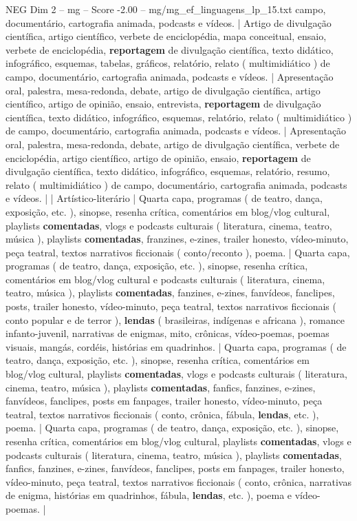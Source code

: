 \begin{textsample}{NEG Dim 2 – mg – Score -2.00 – mg/mg\_ef\_linguagens\_lp\_15.txt}
campo, documentário, cartografia animada, podcasts e vídeos. | Artigo de divulgação científica, artigo científico, verbete de enciclopédia, mapa conceitual, ensaio, verbete de enciclopédia, \textbf{reportagem} de divulgação científica, texto didático, infográfico, esquemas, tabelas, gráficos, relatório, relato ( multimidiático ) de campo, documentário, cartografia animada, podcasts e vídeos. | Apresentação oral, palestra, mesa-redonda, debate, artigo de divulgação científica, artigo científico, artigo de opinião, ensaio, entrevista, \textbf{reportagem} de divulgação científica, texto didático, infográfico, esquemas, relatório, relato ( multimidiático ) de campo, documentário, cartografia animada, podcasts e vídeos. | Apresentação oral, palestra, mesa-redonda, debate, artigo de divulgação científica, verbete de enciclopédia, artigo científico, artigo de opinião, ensaio, \textbf{reportagem} de divulgação científica, texto didático, infográfico, esquemas, relatório, resumo, relato ( multimidiático ) de campo, documentário, cartografia animada, podcasts e vídeos. | | Artístico-literário | Quarta capa, programas ( de teatro, dança, exposição, etc. ), sinopse, resenha crítica, comentários em blog/vlog cultural, playlists \textbf{comentadas}, vlogs e podcasts culturais ( literatura, cinema, teatro, música ), playlists \textbf{comentadas}, franzines, e-zines, trailer honesto, vídeo-minuto, peça teatral, textos narrativos ficcionais ( conto/reconto ), poema. | Quarta capa, programas ( de teatro, dança, exposição, etc. ), sinopse, resenha crítica, comentários em blog/vlog cultural e podcasts culturais ( literatura, cinema, teatro, música ), playlists \textbf{comentadas}, fanzines, e-zines, fanvídeos, fanclipes, posts, trailer honesto, vídeo-minuto, peça teatral, textos narrativos ficcionais ( conto popular e de terror ), \textbf{lendas} ( brasileiras, indígenas e africana ), romance infanto-juvenil, narrativas de enigmas, mito, crônicas, vídeo-poemas, poemas visuais, mangás, cordéis, histórias em quadrinhos. | Quarta capa, programas ( de teatro, dança, exposição, etc. ), sinopse, resenha crítica, comentários em blog/vlog cultural, playlists \textbf{comentadas}, vlogs e podcasts culturais ( literatura, cinema, teatro, música ), playlists \textbf{comentadas}, fanfics, fanzines, e-zines, fanvídeos, fanclipes, posts em fanpages, trailer honesto, vídeo-minuto, peça teatral, textos narrativos ficcionais ( conto, crônica, fábula, \textbf{lendas}, etc. ), poema. | Quarta capa, programas ( de teatro, dança, exposição, etc. ), sinopse, resenha crítica, comentários em blog/vlog cultural, playlists \textbf{comentadas}, vlogs e podcasts culturais ( literatura, cinema, teatro, música ), playlists \textbf{comentadas}, fanfics, fanzines, e-zines, fanvídeos, fanclipes, posts em fanpages, trailer honesto, vídeo-minuto, peça teatral, textos narrativos ficcionais ( conto, crônica, narrativas de enigma, histórias em quadrinhos, fábula, \textbf{lendas}, etc. ), poema e vídeo-poemas. |

\end{textsample}
